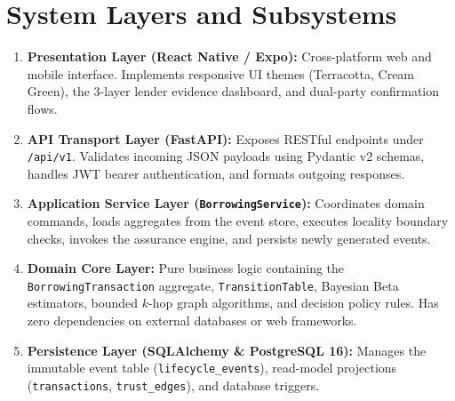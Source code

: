 \section{System Layers and Subsystems}
\begin{enumerate}
    \item \textbf{Presentation Layer (React Native / Expo):} Cross-platform web and mobile interface. Implements responsive UI themes (Terracotta, Cream Green), the 3-layer lender evidence dashboard, and dual-party confirmation flows.
    \item \textbf{API Transport Layer (FastAPI):} Exposes RESTful endpoints under \texttt{/api/v1}. Validates incoming JSON payloads using Pydantic v2 schemas, handles JWT bearer authentication, and formats outgoing responses.
    \item \textbf{Application Service Layer (\texttt{BorrowingService}):} Coordinates domain commands, loads aggregates from the event store, executes locality boundary checks, invokes the assurance engine, and persists newly generated events.
    \item \textbf{Domain Core Layer:} Pure business logic containing the \texttt{BorrowingTransaction} aggregate, \texttt{TransitionTable}, Bayesian Beta estimators, bounded $k$-hop graph algorithms, and decision policy rules. Has zero dependencies on external databases or web frameworks.
    \item \textbf{Persistence Layer (SQLAlchemy \& PostgreSQL 16):} Manages the immutable event table (\texttt{lifecycle\_events}), read-model projections (\texttt{transactions}, \texttt{trust\_edges}), and database triggers.
\end{enumerate}

